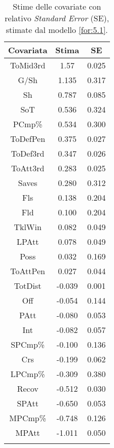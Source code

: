 \begin{table}[htbp]
	
	\renewcommand{\arraystretch}{1.7}
	\centering
	\begin{tabular}{c c c }
		\hline	
		
		\textbf{Covariata} & \textbf{Stima} & \textbf{SE} \\	
		\hline
		ToMid3rd & 1.57 & 0.025\\
		G/Sh & 1.135 & 0.317 \\
		Sh & 0.787 & 0.085 \\  
		SoT &  0.536 & 0.324 \\  
		PCmp\% & 0.534 & 0.300 \\
		ToDefPen & 0.375 & 0.027 \\      
		ToDef3rd & 0.347 & 0.026 \\
		ToAtt3rd & 0.283 & 0.025 \\     	     	 
		Saves & 0.280 & 0.312 \\ 
		Fls & 0.138 & 0.204  \\     
		Fld & 0.100 & 0.204  \\
		TklWin &  0.082 & 0.049  \\    
		LPAtt & 0.078 & 0.049  \\ 		
		Poss & 0.032 & 0.169 \\ 
		ToAttPen & 0.027 & 0.044 \\  
		TotDist & -0.039 & 0.001 \\  	
		Off & -0.054 & 0.144  \\
		PAtt & -0.080 & 0.053 \\ 
		Int & -0.082 & 0.057 \\  
		SPCmp\% & -0.100 & 0.136 \\ 
		Crs & -0.199 & 0.062\\  
		LPCmp\% & -0.309 & 0.380 \\ 
		Recov &  -0.512 & 0.030 \\        
		SPAtt & -0.650 & 0.053 \\     
		MPCmp\% & -0.748 & 0.126 \\
		MPAtt & -1.011 & 0.050 \\     		     		   		    
		\hline
		& &  \\
		
	\end{tabular} \hbox{}
	\caption{Stime delle covariate con relativo \emph{Standard 
			Error} (SE), stimate dal modello \ref{for:5.1}.} \label{tab:BTC2} 
	
\end{table}

